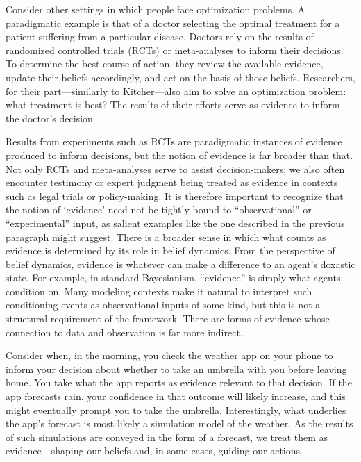 \documentclass{article}
\begin{document}
Consider other settings in which people face optimization problems. A paradigmatic example is that of a doctor selecting the optimal treatment for a patient suffering from a particular disease. Doctors rely on the results of randomized controlled trials (RCTs) or meta-analyses to inform their decisions. To determine the best course of action, they review the available evidence, update their beliefs accordingly, and act on the basis of those beliefs. Researchers, for their part—similarly to Kitcher—also aim to solve an optimization problem: what treatment is best? The results of their efforts serve as evidence to inform the doctor's decision.

Results from experiments such as RCTs are paradigmatic instances of evidence produced to inform decisions, but the notion of evidence is far broader than that. Not only RCTs and meta-analyses serve to assist decision-makers; we also often encounter testimony or expert judgment being treated as evidence in contexts such as legal trials or policy-making. It is therefore important to recognize that the notion of `evidence' need not be tightly bound to ``observational'' or ``experimental'' input, as salient examples like the one described in the previous paragraph might suggest. There is a broader sense in which what counts as evidence is determined by its role in belief dynamics. From the perspective of belief dynamics, evidence is whatever can make a difference to an agent's doxastic state. For example, in standard Bayesianism, ``evidence'' is simply what agents condition on. Many modeling contexts make it natural to interpret such conditioning events as observational inputs of some kind, but this is not a structural requirement of the framework. There are forms of evidence whose connection to data and observation is far more indirect.

Consider when, in the morning, you check the weather app on your phone to inform your decision about whether to take an umbrella with you before leaving home. You take what the app reports as evidence relevant to that decision. If the app forecasts rain, your confidence in that outcome will likely increase, and this might eventually prompt you to take the umbrella. Interestingly, what underlies the app's forecast is most likely a simulation model of the weather. As the results of such simulations are conveyed in the form of a forecast, we treat them as evidence—shaping our beliefs and, in some cases, guiding our actions.
\end{document}
